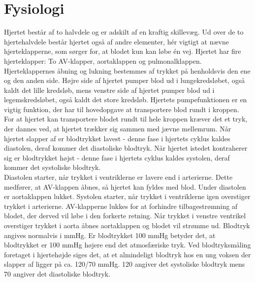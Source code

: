 \section{Fysiologi}
\vspace{0.2 cm}
Hjertet består af to halvdele og er adskilt af en kraftig skillevæg. Ud over de to hjertehalvdele består hjertet også af andre elementer, hér vigtigt at nævne hjerteklapperne, som sørger for, at blodet kun kan løbe én vej. Hjertet har fire hjerteklapper: To AV-klapper, aortaklappen og pulmonalklappen. Hjerteklappernes åbning og lukning bestemmes af trykket på henholdsvis den ene og den anden side. Højre side af hjertet pumper blod ud i lungekredsløbet, også kaldt det lille kredsløb, mens venstre side af hjertet pumper blod ud i legemskredsløbet, også kaldt det store kredsløb. Hjertets pumpefunktionen er en vigtig funktion, der har til hovedopgave at transportere blod rundt i kroppen.\\
\vspace{0.2 cm}
For at hjertet kan transportere blodet rundt til hele kroppen kræver det et tryk, der dannes ved, at hjertet trækker sig sammen med jævne mellemrum. Når hjertet slapper af er blodtrykket lavest - denne fase i hjertets cyklus kaldes diastolen, deraf kommer det diastoliske blodtryk. Når hjertet istedet kontraherer sig er blodtrykket højst - denne fase i hjertets cyklus kaldes systolen, deraf kommer det systoliske blodtryk.\\
\vspace{0.2 cm}
Diastolen starter, når trykket i ventriklerne er lavere end i arterierne. Dette medfører, at AV-klappen åbnes, så hjertet kan fyldes med blod. Under diastolen er aortaklappen lukket.
\vspace{0.2 cm}
Systolen starter, når trykket i ventriklerne igen overstiger trykket i arterierne. AV-klapperne lukkes for at forhindre tilbagestrømning af blodet, der derved vil løbe i den forkerte retning. Når trykket i venstre ventrikel overstiger trykket i aorta åbnes aortaklappen og blodet vil strømme ud. 
\vspace{0.2 cm}
Blodtryk angives normalvis i mmHg. Er blodtrykket 100 mmHg betyder det, at blodtrykket er 100 mmHg højere end det atmosfæriske tryk. Ved blodtryksmåling foretaget i hjertehøjde siges det, at et almindeligt blodtryk hos en ung voksen der slapper af ligger på ca. 120/70 mmHg. 120 angiver det systoliske blodtryk mens 70 angiver det diastoliske blodtryk.
